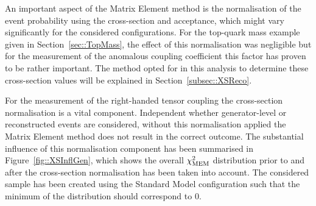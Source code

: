 An important aspect of the Matrix Element method is the normalisation of the event probability using the cross-section and acceptance, which might vary significantly for the considered configurations. For the top-quark mass example given in Section~\ref{sec::TopMass}, the effect of this normalisation was negligible but for the measurement of the anomalous coupling coefficient this factor has proven to be rather important. The method opted for in this analysis to determine these cross-section values will be explained in Section~\ref{subsec::XSReco}.

For the measurement of the right-handed tensor coupling the cross-section normalisation is a vital component.
Independent whether generator-level or reconstructed events are considered, without this normalisation applied the Matrix Element method does not result in the correct outcome.
The substantial influence of this normalisation component has been summarised in Figure~\ref{fig::XSInflGen}, which shows the overall $\chi^{2}_{\textrm{MEM}}$ distribution prior to and after the cross-section normalisation has been taken into account. The considered sample has been created using the Standard Model configuration such that the minimum of the distribution should correspond to $0$.
